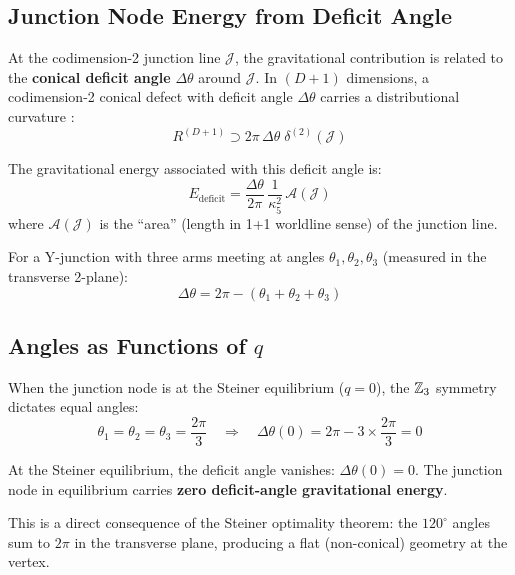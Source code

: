 \subsection{Junction Node Energy from Deficit Angle}

At the codimension-2 junction line $\mathcal{J}$, the gravitational
contribution is related to the \textbf{conical deficit angle}
$\Delta\theta$ around $\mathcal{J}$. In $(D+1)$ dimensions, a
codimension-2 conical defect with deficit angle $\Delta\theta$ carries
a distributional curvature \tagDer:
\begin{equation}
    R^{(D+1)} \supset 2\pi\,\Delta\theta\;\delta^{(2)}(\mathcal{J})
    \label{eq:deficit_curvature}
\end{equation}

The gravitational energy associated with this deficit angle is:
\begin{equation}
    E_{\mathrm{deficit}} = \frac{\Delta\theta}{2\pi}\,
    \frac{1}{\kappa_5^2}\,\mathcal{A}(\mathcal{J})
    \label{eq:deficit_energy}
\end{equation}
where $\mathcal{A}(\mathcal{J})$ is the ``area'' (length in 1+1
worldline sense) of the junction line.

For a Y-junction with three arms meeting at angles $\theta_1, \theta_2,
\theta_3$ (measured in the transverse 2-plane):
\begin{equation}
    \Delta\theta = 2\pi - (\theta_1 + \theta_2 + \theta_3)
    \label{eq:deficit_Y}
\end{equation}

\subsection{Angles as Functions of $q$}

When the junction node is at the Steiner equilibrium ($q = 0$), the
$\mathbb{Z}_3$ symmetry dictates equal angles:
\begin{equation}
    \theta_1 = \theta_2 = \theta_3 = \frac{2\pi}{3}
    \quad\Longrightarrow\quad
    \Delta\theta(0) = 2\pi - 3 \times \frac{2\pi}{3} = 0
    \label{eq:angles_steiner}
\end{equation}

\begin{resultbox}[title=Critical Observation]
At the Steiner equilibrium, the deficit angle vanishes:
$\Delta\theta(0) = 0$. The junction node in equilibrium carries
\textbf{zero deficit-angle gravitational energy}.

This is a direct consequence of the Steiner optimality theorem:
the $120^\circ$ angles sum to $2\pi$ in the transverse plane,
producing a flat (non-conical) geometry at the vertex.
\tagDc
\end{resultbox}


